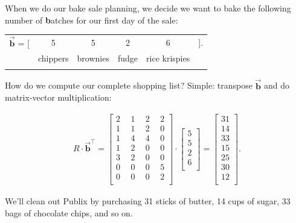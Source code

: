 When we do our bake sale planning, we decide we want to bake the following
number of \textbf{b}atches for our first day of the sale:

\begin{center}
\begin{tabular}{cccccc}
$\overrightarrow{\textbf{b}}$ = [ & 5 & 5 & 2 & 6 & ]. \\
& \scriptsize{chippers} & \scriptsize{brownies} & \scriptsize{fudge} &
\scriptsize{rice krispies} & \\
\normalsize
\end{tabular}
\end{center}
\vspace{-.15in}

How do we compute our complete shopping list? Simple: transpose
$\overrightarrow{\textbf{b}}$ and do matrix-vector multiplication:

\vspace{-.15in}
\begin{align*}
R \cdot \overrightarrow{\textbf{b}}^\intercal =
\begin{bmatrix}
2 \ & \ 1 \ & \ 2 \ & \ 2 \\
1 \ & \ 1 \ & \ 2 \ & \ 0 \\
1 \ & \ 4 \ & \ 4 \ & \ 0 \\
1 \ & \ 2 \ & \ 0 \ & \ 0 \\
3 \ & \ 2 \ & \ 0 \ & \ 0 \\
0 \ & \ 0 \ & \ 0 \ & \ 5 \\
0 \ & \ 0 \ & \ 0 \ & \ 2 \\
\end{bmatrix} \cdot 
\begin{bmatrix}
5 \\ 5 \\ 2 \\ 6 \\
\end{bmatrix} =
\begin{bmatrix}
31\\ 14\\ 33\\ 15\\ 25\\ 30\\ 12 \\
\end{bmatrix}.
\end{align*}
\vspace{-.15in}

We'll clean out Publix by purchasing 31 sticks of butter, 14 cups of sugar, 33
bags of chocolate chips, and so on.

